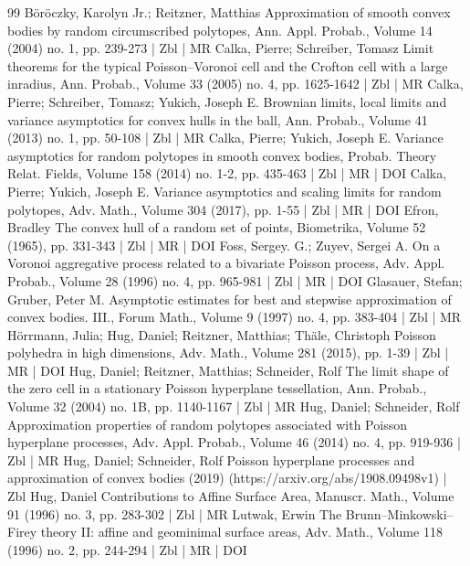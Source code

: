 \documentclass[10pt]{amsart}
\theoremstyle{definition}\newtheorem{defi}[theo]{Definition}\newtheorem{rema}[theo]{Remark}\newtheorem{exam}[theo]{Example}\newtheorem{exem}[theo]{Example}\newtheorem{nota}[theo]{Notation}
\begin{document}
\begin{thebibliography}{99}
Böröczky, Karolyn Jr.; Reitzner, Matthias Approximation of smooth convex bodies by random circumscribed polytopes, Ann. Appl. Probab., Volume 14 (2004) no. 1, pp. 239-273 | Zbl | MR
Calka, Pierre; Schreiber, Tomasz Limit theorems for the typical Poisson–Voronoi cell and the Crofton cell with a large inradius, Ann. Probab., Volume 33 (2005) no. 4, pp. 1625-1642 | Zbl | MR
Calka, Pierre; Schreiber, Tomasz; Yukich, Joseph E. Brownian limits, local limits and variance asymptotics for convex hulls in the ball, Ann. Probab., Volume 41 (2013) no. 1, pp. 50-108 | Zbl | MR
Calka, Pierre; Yukich, Joseph E. Variance asymptotics for random polytopes in smooth convex bodies, Probab. Theory Relat. Fields, Volume 158 (2014) no. 1-2, pp. 435-463 | Zbl | MR | DOI
Calka, Pierre; Yukich, Joseph E. Variance asymptotics and scaling limits for random polytopes, Adv. Math., Volume 304 (2017), pp. 1-55 | Zbl | MR | DOI
Efron, Bradley The convex hull of a random set of points, Biometrika, Volume 52 (1965), pp. 331-343 | Zbl | MR | DOI
Foss, Sergey. G.; Zuyev, Sergei A. On a Voronoi aggregative process related to a bivariate Poisson process, Adv. Appl. Probab., Volume 28 (1996) no. 4, pp. 965-981 | Zbl | MR | DOI
Glasauer, Stefan; Gruber, Peter M. Asymptotic estimates for best and stepwise approximation of convex bodies. III., Forum Math., Volume 9 (1997) no. 4, pp. 383-404 | Zbl | MR
Hörrmann, Julia; Hug, Daniel; Reitzner, Matthias; Thäle, Christoph Poisson polyhedra in high dimensions, Adv. Math., Volume 281 (2015), pp. 1-39 | Zbl | MR | DOI
Hug, Daniel; Reitzner, Matthias; Schneider, Rolf The limit shape of the zero cell in a stationary Poisson hyperplane tessellation, Ann. Probab., Volume 32 (2004) no. 1B, pp. 1140-1167 | Zbl | MR
Hug, Daniel; Schneider, Rolf Approximation properties of random polytopes associated with Poisson hyperplane processes, Adv. Appl. Probab., Volume 46 (2014) no. 4, pp. 919-936 | Zbl | MR
Hug, Daniel; Schneider, Rolf Poisson hyperplane processes and approximation of convex bodies (2019) (https://arxiv.org/abs/1908.09498v1) | Zbl
Hug, Daniel Contributions to Affine Surface Area, Manuscr. Math., Volume 91 (1996) no. 3, pp. 283-302 | Zbl | MR
Lutwak, Erwin The Brunn–Minkowski–Firey theory II: affine and geominimal surface areas, Adv. Math., Volume 118 (1996) no. 2, pp. 244-294 | Zbl | MR | DOI

\end{thebibliography}
\end{document}
